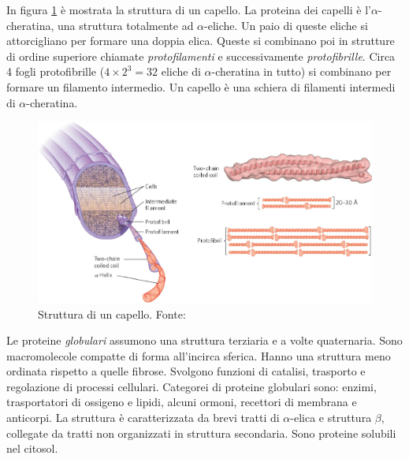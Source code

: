{{\par In figura \ref{fig:capello} è mostrata la struttura di un capello. La proteina dei capelli è l'$\alpha$-cheratina, una struttura totalmente ad $\alpha$-eliche. Un paio di queste eliche si attorcigliano per formare una doppia elica. Queste si combinano poi in strutture di ordine superiore chiamate \textit{protofilamenti} e successivamente \textit{protofibrille}. Circa 4 fogli protofibrille ($4\times2^{3}=32$ eliche di $\alpha$-cheratina in tutto) si combinano per formare un filamento intermedio. Un capello è una schiera di filamenti intermedi di $\alpha$-cheratina.

\begin{figure}[h]
	\centering
	\includegraphics[scale=0.6]{images/capello-full.png}
	\caption{Struttura di un capello. Fonte: \cite{nelson2017lehninger}}
	\label{fig:capello}
\end{figure}

Le proteine \textit{globulari} assumono una struttura terziaria e a volte quaternaria. Sono macromolecole compatte di forma all'incirca sferica. Hanno una struttura meno ordinata rispetto a quelle fibrose. Svolgono funzioni di catalisi, trasporto e regolazione di processi cellulari. Categorei di proteine globulari sono: enzimi, trasportatori di ossigeno e lipidi, alcuni ormoni, recettori di membrana e anticorpi. La struttura è caratterizzata da brevi tratti di $\alpha$-elica e struttura $\beta$, collegate da tratti non organizzati in struttura secondaria. Sono proteine solubili nel citosol. 

}
}

